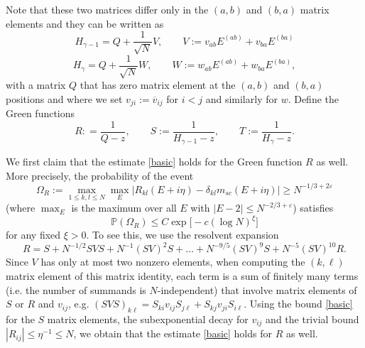 \documentclass[draft]{article}
\newcommand{\e}{\varepsilon}
\newcommand{\be}{\begin{equation}}
\newcommand{\ee}{\end{equation}}
\newcommand{\ov}{\overline}
\renewcommand{\P}{{\mathbb P}}
\numberwithin{equation}{section}
\numberwithin{theorem}{section}
\numberwithin{definition}{section}
\numberwithin{remark}{section}
\begin{document}
Note that these two matrices differ only in the $(a,b)$ and $(b,a)$ matrix elements 
and they can be written as
\be\label{defHg1}
    H_{\gamma-1} = Q + \frac{1}{\sqrt{N}}V, \qquad V:= v_{ab}E^{(ab)}
+ v_{ba}  E^{(ba)}
\ee
$$
    H_\gamma = Q + \frac{1}{\sqrt{N}} W, \qquad W:= w_{ab}E^{(ab)} +
   w_{ba} E^{(ba)},
$$
with a matrix $Q$ that has zero matrix element at the $(a,b)$ and $(b,a)$ positions and
where we set $v_{ji}:= \ov v_{ij}$ for $i<j$ and similarly for $w$.
Define the  Green functions
\be\label{defG}
      R: = \frac{1}{Q-z}, \qquad S:= \frac{1}{H_{\gamma-1}-z}, \qquad T:= \frac{1}{H_{\gamma}-z}.
\ee


We first claim that the estimate \eqref{basic} holds for the Green function $R$ as well. 
More precisely, the probability of the event
\be
  \Omega_R:= \max_{1 \le k,l \le N}  
 \max_{E}\big| R_{k l}(E+i\eta) -\delta_{kl}m_{sc}(E+i \eta)
\big|\ge N^{-1/3+2\e}
\label{defOMR}
\ee
(where $\max_E$ is the maximum over all $E$ with $|E-2|\le N^{-2/3+\e}$)
satisfies
\be
  \P (\Omega_R)\le  C\exp{\big[-c(\log N)^\xi\big]}
\label{POMR}
\ee
for any fixed $\xi>0$.
To see this, we use the 
resolvent expansion 
\be\label{relRS}
 R = S  +   N^{-1/2}SV S +   N^{-1}(SV)^2 S+ \ldots + N^{-9/5} (SV)^9S+
N^{-5} (SV)^{10} R.
\ee
Since $V$ has only at most two nonzero elements, when
computing the $(k,\ell)$ matrix element of this matrix identity,
each term is a sum of finitely many terms (i.e. the number of summands
is $N$-independent) that  involve
matrix elements of $S$ or $R$ and $v_{ij}$, e.g.  $(SVS)_{k\ell} =S_{ki} v_{ij} S_{j\ell}
+ S_{kj} v_{ji} S_{i\ell}$.  Using the bound \eqref{basic} for the $S$ matrix elements,
the subexponential decay for $v_{ij}$ and 
 the trivial bound $|R_{ij}| \le  \eta^{-1}\leq N$, we obtain that 
the estimate \eqref{basic} holds for $R$ as well. 

\medskip
\end{document}

